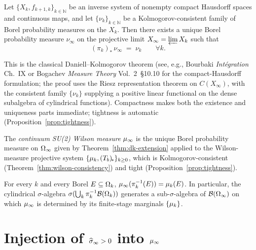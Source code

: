 \begin{theorem}
\label{thm:dk-extension}
Let $\{X_k, f_{k+1,k}\}_{k \in \mathbb{N}}$ be an inverse system of
nonempty compact Hausdorff spaces and continuous maps, and let
$\{\nu_k\}_{k \in \mathbb{N}}$ be a Kolmogorov-consistent family of
Borel probability measures on the $X_k$.  Then there exists a unique
Borel probability measure $\nu_\infty$ on the projective limit
$X_\infty = \varprojlim X_k$ such that
\begin{equation*}
  (\pi_k)_* \, \nu_\infty \;=\; \nu_k \qquad \forall k.
\end{equation*}
\end{theorem}

This is the classical Daniell--Kolmogorov theorem
(see, e.g., Bourbaki \emph{Intégration} Ch.~IX or Bogachev
\emph{Measure Theory} Vol.~2~\S10.10 for the compact-Hausdorff
formulation; the proof uses the Riesz representation theorem on
$C(X_\infty)$, with the consistent family $\{\nu_k\}$ supplying a
positive linear functional on the dense subalgebra of cylindrical
functions).  Compactness makes both the existence and uniqueness
parts immediate; tightness is automatic
(Proposition~\ref{prop:tightness}).

\begin{definition}
\label{def:mu-infinity}
The \emph{continuum SU(2) Wilson measure} $\mu_\infty$ is the unique
Borel probability measure on $\Omega_\infty$ given by
Theorem~\ref{thm:dk-extension} applied to the Wilson-measure
projective system $\{\mu_k, (T_b)_{\!*}\}_{k \ge 0}$, which is
Kolmogorov-consistent (Theorem~\ref{thm:wilson-consistency}) and
tight (Proposition~\ref{prop:tightness}).
\end{definition}

\begin{corollary}
\label{cor:cylindrical}
For every $k$ and every Borel $E \subseteq \Omega_k$,
$\mu_\infty(\pi_k^{-1}(E)) = \mu_k(E)$.  In particular, the cylindrical
$\sigma$-algebra $\sigma(\bigcup_k \pi_k^{-1} \mathcal{B}(\Omega_k))$
generates a sub-$\sigma$-algebra of $\mathcal{B}(\Omega_\infty)$ on which
$\mu_\infty$ is determined by its finite-stage marginals $\{\mu_k\}$.
\end{corollary}

\section{Injection of $\widehat{\sigma}_\infty > 0$ into $\mu_\infty$}
\label{sec:sigma-injection}

